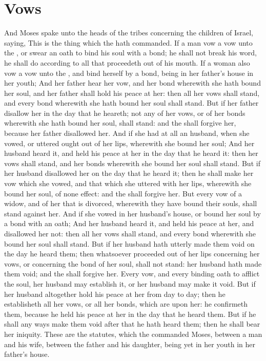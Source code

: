 \section*{Vows}
\begin{biblechapter} %
\verse And Moses spake unto the heads of the tribes concerning the children of Israel, saying, This is the thing which the \LORD hath commanded.
\verse If a man vow a vow unto the \LORD, or swear an oath to bind his soul with a bond; he shall not break his word, he shall do according to all that proceedeth out of his mouth.
\verse If a woman also vow a vow unto the \LORD, and bind herself by a bond, being in her father's house in her youth;
\verse And her father hear her vow, and her bond wherewith she hath bound her soul, and her father shall hold his peace at her: then all her vows shall stand, and every bond wherewith she hath bound her soul shall stand.
\verse But if her father disallow her in the day that he heareth; not any of her vows, or of her bonds wherewith she hath bound her soul, shall stand: and the \LORD shall forgive her, because her father disallowed her.
\verse And if she had at all an husband, when she vowed, or uttered ought out of her lips, wherewith she bound her soul;
\verse And her husband heard it, and held his peace at her in the day that he heard it: then her vows shall stand, and her bonds wherewith she bound her soul shall stand.
\verse But if her husband disallowed her on the day that he heard it; then he shall make her vow which she vowed, and that which she uttered with her lips, wherewith she bound her soul, of none effect: and the \LORD shall forgive her.
\verse But every vow of a widow, and of her that is divorced, wherewith they have bound their souls, shall stand against her.
\verse And if she vowed in her husband's house, or bound her soul by a bond with an oath;
\verse And her husband heard it, and held his peace at her, and disallowed her not: then all her vows shall stand, and every bond wherewith she bound her soul shall stand.
\verse But if her husband hath utterly made them void on the day he heard them; then whatsoever proceeded out of her lips concerning her vows, or concerning the bond of her soul, shall not stand: her husband hath made them void; and the \LORD shall forgive her.
\verse Every vow, and every binding oath to afflict the soul, her husband may establish it, or her husband may make it void.
\verse But if her husband altogether hold his peace at her from day to day; then he establisheth all her vows, or all her bonds, which are upon her: he confirmeth them, because he held his peace at her in the day that he heard them.
\verse But if he shall any ways make them void after that he hath heard them; then he shall bear her iniquity.
\verse These are the statutes, which the \LORD commanded Moses, between a man and his wife, between the father and his daughter, being yet in her youth in her father's house.
\end{biblechapter}

